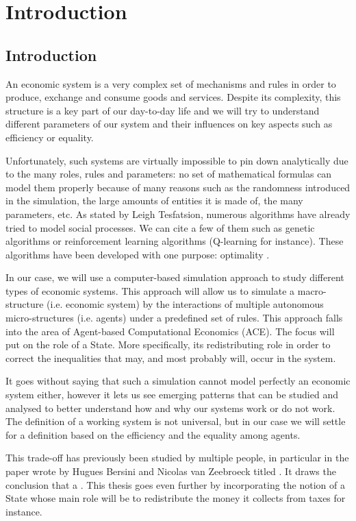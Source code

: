 \chapter{Introduction}

\section{Introduction}

An economic system is a very complex set of mechanisms and rules in order to produce, exchange and consume goods and services. Despite its complexity, this structure is a key part of our day-to-day life and we will try to understand different parameters of our system and their influences on key aspects such as efficiency or equality.

Unfortunately, such systems are virtually impossible to pin down analytically due to the many roles, rules and parameters: no set of mathematical formulas can model them properly because of many reasons such as the randomness introduced in the simulation, the large amounts of entities it is made of, the many parameters, etc.
As stated by Leigh Tesfatsion, numerous algorithms have already tried to model social processes. We can cite a few of them such as genetic algorithms or reinforcement learning algorithms (Q-learning for instance). These algorithms have been developed with one purpose: optimality \cite{tesfatsion_bottom_up}. 

In our case, we will use a computer-based simulation approach to study different types of economic systems. This approach will allow us to simulate a macro-structure (i.e. economic system) by the interactions of multiple autonomous micro-structures (i.e. agents) under a predefined set of rules. This approach falls into the area of Agent-based Computational Economics (ACE). The focus will put on the role of a State. More specifically, its redistributing role in order to correct the inequalities that may, and most probably will, occur in the system. 

It goes without saying that such a simulation cannot model perfectly an economic system either, however it lets us see emerging patterns that can be studied and analysed to better understand how and why our systems work or do not work. The definition of a working system is not universal, but in our case we will settle for a definition based on the efficiency and the equality among agents.

This trade-off has previously been studied by multiple people, in particular in the paper wrote by Hugues Bersini and Nicolas van Zeebroeck titled  \cite{bersini}. It draws the conclusion that a . This thesis goes even further by incorporating the notion of a State whose main role will be to redistribute the money it collects from taxes for instance. 

